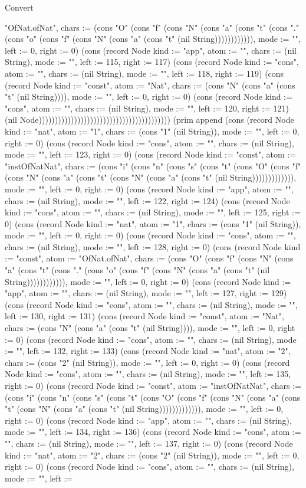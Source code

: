 \begin{lexlean}{Convert}
\begin{semanticmodule}
{"OfNat.ofNat", chars := (cons "O" (cons "f" (cons "N" (cons "a" (cons "t" (cons "." (cons "o" (cons "f" (cons "N" (cons "a" (cons "t" (nil String)))))))))))), mode := "", left := 0, right := 0}) (cons (record Node {kind := "app", atom := "", chars := (nil String), mode := "", left := 115, right := 117}) (cons (record Node {kind := "cons", atom := "", chars := (nil String), mode := "", left := 118, right := 119}) (cons (record Node {kind := "const", atom := "Nat", chars := (cons "N" (cons "a" (cons "t" (nil String)))), mode := "", left := 0, right := 0}) (cons (record Node {kind := "cons", atom := "", chars := (nil String), mode := "", left := 120, right := 121}) (nil Node))))))))))))))))))))))))))))))))))))))))) (prim append (cons (record Node {kind := "nat", atom := "1", chars := (cons "1" (nil String)), mode := "", left := 0, right := 0}) (cons (record Node {kind := "cons", atom := "", chars := (nil String), mode := "", left := 123, right := 0}) (cons (record Node {kind := "const", atom := "instOfNatNat", chars := (cons "i" (cons "n" (cons "s" (cons "t" (cons "O" (cons "f" (cons "N" (cons "a" (cons "t" (cons "N" (cons "a" (cons "t" (nil String))))))))))))), mode := "", left := 0, right := 0}) (cons (record Node {kind := "app", atom := "", chars := (nil String), mode := "", left := 122, right := 124}) (cons (record Node {kind := "cons", atom := "", chars := (nil String), mode := "", left := 125, right := 0}) (cons (record Node {kind := "nat", atom := "1", chars := (cons "1" (nil String)), mode := "", left := 0, right := 0}) (cons (record Node {kind := "cons", atom := "", chars := (nil String), mode := "", left := 128, right := 0}) (cons (record Node {kind := "const", atom := "OfNat.ofNat", chars := (cons "O" (cons "f" (cons "N" (cons "a" (cons "t" (cons "." (cons "o" (cons "f" (cons "N" (cons "a" (cons "t" (nil String)))))))))))), mode := "", left := 0, right := 0}) (cons (record Node {kind := "app", atom := "", chars := (nil String), mode := "", left := 127, right := 129}) (cons (record Node {kind := "cons", atom := "", chars := (nil String), mode := "", left := 130, right := 131}) (cons (record Node {kind := "const", atom := "Nat", chars := (cons "N" (cons "a" (cons "t" (nil String)))), mode := "", left := 0, right := 0}) (cons (record Node {kind := "cons", atom := "", chars := (nil String), mode := "", left := 132, right := 133}) (cons (record Node {kind := "nat", atom := "2", chars := (cons "2" (nil String)), mode := "", left := 0, right := 0}) (cons (record Node {kind := "cons", atom := "", chars := (nil String), mode := "", left := 135, right := 0}) (cons (record Node {kind := "const", atom := "instOfNatNat", chars := (cons "i" (cons "n" (cons "s" (cons "t" (cons "O" (cons "f" (cons "N" (cons "a" (cons "t" (cons "N" (cons "a" (cons "t" (nil String))))))))))))), mode := "", left := 0, right := 0}) (cons (record Node {kind := "app", atom := "", chars := (nil String), mode := "", left := 134, right := 136}) (cons (record Node {kind := "cons", atom := "", chars := (nil String), mode := "", left := 137, right := 0}) (cons (record Node {kind := "nat", atom := "2", chars := (cons "2" (nil String)), mode := "", left := 0, right := 0}) (cons (record Node {kind := "cons", atom := "", chars := (nil String), mode := "", left := }
\end{semanticmodule}
\end{lexlean}
